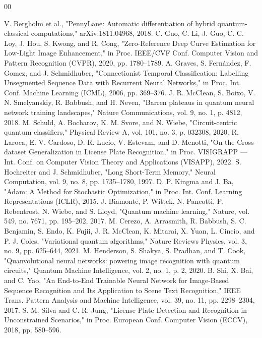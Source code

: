 \documentclass{ieeeaccess}
\begin{document}
\begin{thebibliography}{00}

 V. Bergholm et al., "PennyLane: Automatic differentiation of hybrid quantum-classical computations," arXiv:1811.04968, 2018.
 C. Guo, C. Li, J. Guo, C. C. Loy, J. Hou, S. Kwong, and R. Cong, "Zero-Reference Deep Curve Estimation for Low-Light Image Enhancement," in Proc. IEEE/CVF Conf. Computer Vision and Pattern Recognition (CVPR), 2020, pp. 1780--1789.
 A. Graves, S. Fernández, F. Gomez, and J. Schmidhuber, "Connectionist Temporal Classification: Labelling Unsegmented Sequence Data with Recurrent Neural Networks," in Proc. Int. Conf. Machine Learning (ICML), 2006, pp. 369--376.
 J. R. McClean, S. Boixo, V. N. Smelyanskiy, R. Babbush, and H. Neven, "Barren plateaus in quantum neural network training landscapes," Nature Communications, vol. 9, no. 1, p. 4812, 2018.
 M. Schuld, A. Bocharov, K. M. Svore, and N. Wiebe, "Circuit-centric quantum classifiers," Physical Review A, vol. 101, no. 3, p. 032308, 2020.
 R. Laroca, E. V. Cardoso, D. R. Lucio, V. Estevam, and D. Menotti, "On the Cross-dataset Generalization in License Plate Recognition," in Proc. VISIGRAPP — Int. Conf. on Computer Vision Theory and Applications (VISAPP), 2022.
 S. Hochreiter and J. Schmidhuber, "Long Short-Term Memory," Neural Computation, vol. 9, no. 8, pp. 1735--1780, 1997.
 D. P. Kingma and J. Ba, "Adam: A Method for Stochastic Optimization," in Proc. Int. Conf. Learning Representations (ICLR), 2015.
 J. Biamonte, P. Wittek, N. Pancotti, P. Rebentrost, N. Wiebe, and S. Lloyd, "Quantum machine learning," Nature, vol. 549, no. 7671, pp. 195--202, 2017.
 M. Cerezo, A. Arrasmith, R. Babbush, S. C. Benjamin, S. Endo, K. Fujii, J. R. McClean, K. Mitarai, X. Yuan, L. Cincio, and P. J. Coles, "Variational quantum algorithms," Nature Reviews Physics, vol. 3, no. 9, pp. 625--644, 2021.
 M. Henderson, S. Shakya, S. Pradhan, and T. Cook, "Quanvolutional neural networks: powering image recognition with quantum circuits," Quantum Machine Intelligence, vol. 2, no. 1, p. 2, 2020.
 B. Shi, X. Bai, and C. Yao, "An End-to-End Trainable Neural Network for Image-Based Sequence Recognition and Its Application to Scene Text Recognition," IEEE Trans. Pattern Analysis and Machine Intelligence, vol. 39, no. 11, pp. 2298--2304, 2017.
 S. M. Silva and C. R. Jung, "License Plate Detection and Recognition in Unconstrained Scenarios," in Proc. European Conf. Computer Vision (ECCV), 2018, pp. 580--596.

\end{thebibliography}
\end{document}
